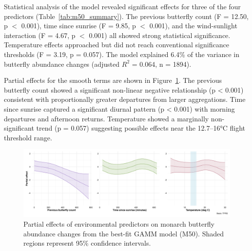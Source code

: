Statistical analysis of the model revealed significant effects for three of the four predictors (Table~\ref{tab:m50_summary}). The previous butterfly count (F = 12.50, p $<$ 0.001), time since sunrise (F = 9.85, p $<$ 0.001), and the wind-sunlight interaction (F = 4.67, p $<$ 0.001) all showed strong statistical significance. Temperature effects approached but did not reach conventional significance thresholds (F = 3.19, p = 0.057). The model explained 6.4\% of the variance in butterfly abundance changes (adjusted $R^2$ = 0.064, n = 1894).



Partial effects for the smooth terms are shown in Figure~\ref{fig:partial_effects_30min}. The previous butterfly count showed a significant non-linear negative relationship (p < 0.001) consistent with proportionally greater departures from larger aggregations. Time since sunrise captured a significant diurnal pattern (p < 0.001) with morning departures and afternoon returns. Temperature showed a marginally non-significant trend (p = 0.057) suggesting possible effects near the 12.7–16°C flight threshold range.

\begin{figure}[htbp]
    \centering
    \includegraphics[width=\textwidth]{supplemental/results/30_min/figures/partial_effects_best_1x3.png}
    \caption{Partial effects of environmental predictors on monarch butterfly abundance changes from the best-fit GAMM model (M50). Shaded regions represent 95\% confidence intervals.}
    \label{fig:partial_effects_30min}
\end{figure}


